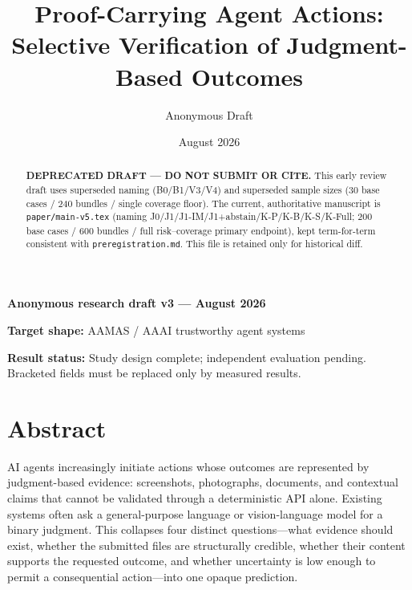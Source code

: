 \documentclass[11pt]{article}
\title{Proof-Carrying Agent Actions: Selective Verification of Judgment-Based Outcomes}\author{Anonymous Draft}\date{August 2026}
\begin{document}
\maketitle\begin{abstract}\textbf{DEPRECATED DRAFT --- DO NOT SUBMIT OR CITE.} This early review draft uses superseded naming (B0/B1/V3/V4) and superseded sample sizes (30 base cases / 240 bundles / single coverage floor). The current, authoritative manuscript is \texttt{paper/main-v5.tex} (naming J0/J1/J1-IM/J1+abstain/K-P/K-B/K-S/K-Full; 200 base cases / 600 bundles / full risk--coverage primary endpoint), kept term-for-term consistent with \texttt{preregistration.md}. This file is retained only for historical diff.\end{abstract}

\textbf{Anonymous research draft v3 --- August 2026}  \par
\textbf{Target shape:} AAMAS / AAAI trustworthy agent systems  \par
\textbf{Result status:} Study design complete; independent evaluation pending. Bracketed fields must be replaced only by measured results.\par

\section{Abstract}

AI agents increasingly initiate actions whose outcomes are represented by judgment-based evidence: screenshots, photographs, documents, and contextual claims that cannot be validated through a deterministic API alone. Existing systems often ask a general-purpose language or vision-language model for a binary judgment. This collapses four distinct questions---what evidence should exist, whether the submitted files are structurally credible, whether their content supports the requested outcome, and whether uncertainty is low enough to permit a consequential action---into one opaque prediction.\par
\end{document}
